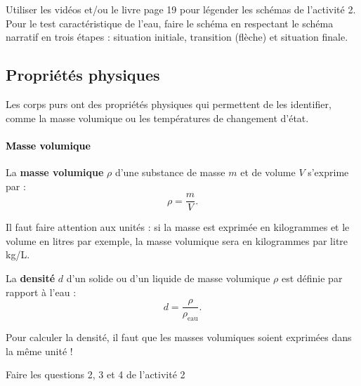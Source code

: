 \documentclass[12pt,a4paper]{article}
\begin{document}
\begin{conseil}
Utiliser les vidéos et/ou le livre page 19 pour légender les schémas de l'activité 2.
Pour le test caractéristique de l'eau, faire le schéma en respectant le schéma narratif en trois étapes : situation initiale, transition (flèche) et situation finale.
\end{conseil}

\subsection{Propriétés physiques}

Les corps purs ont des propriétés physiques qui permettent de les identifier, comme la masse volumique ou les températures de changement d'état.

\paragraph{\textcolor{black}{Masse volumique}}

\begin{definition}
La \textbf{masse volumique} $\rho$ d'une substance de masse $m$ et de volume $V$ s'exprime par :
\begin{equation}
\rho = \frac{m}{V}.
\nonumber
\end{equation}
\end{definition}

\begin{remarque}
Il faut faire attention aux unités : si la masse est exprimée en kilogrammes et le volume en litres par exemple, la masse volumique sera en kilogrammes par litre kg/L.
\end{remarque}

\begin{definition}
La \textbf{densité} $d$ d'un solide ou d'un liquide de masse volumique $\rho$ est définie par rapport à l'eau :
\begin{equation}
d = \frac{\rho}{\rho_\mathrm{eau}}.
\nonumber
\end{equation}
\end{definition}

\begin{remarque}
Pour calculer la densité, il faut que les masses volumiques soient exprimées dans la même unité !
\end{remarque}

\begin{conseil}
Faire les questions 2, 3 et 4 de l'activité 2
\end{conseil}
\end{document}
